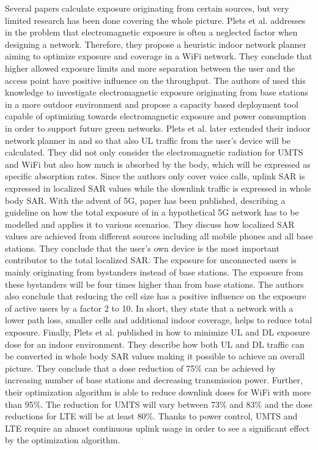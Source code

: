 Several papers calculate exposure originating from certain sources, but very  limited research has been done covering the whole picture.
Plets et al. addresses in \cite{J6_originalExposureFormula} the problem that electromagnetic exposure is often a neglected 
factor when designing a network. Therefore, they propose a heuristic indoor network planner aiming to optimize
exposure and coverage in a WiFi network. They conclude that higher allowed exposure limits and more separation between the user and 
the access point 
have positive influence on the throughput.
The authors of \cite{J1} used this knowledge 
to investigate electromagnetic exposure originating from base stations in a more outdoor environment
and propose a capacity based deployment tool capable of optimizing towards electromagnetic exposure and power consumption 
in order to support future green networks.
Plets et al. later extended their indoor network planner in \cite{J10_RDP} and \cite{J10.1} so that also  
\gls{UL} traffic from the user's device will be calculated. 
They did not only consider the electromagnetic radiation for \gls{UMTS} and WiFi
but also how much is absorbed by the body, which will be expressed as specific absorption rates. 
Since the authors only cover voice calls,
uplink SAR is expressed in localized SAR values while the downlink traffic is expressed in whole body SAR.
 With the advent of 5G, paper \cite{J17_kuehn2019modelling} has been 
published, describing a guideline on how the total exposure of in a hypothetical 5G network has to be modelled and applies it 
to various scenarios.
They discuss how localized SAR values are achieved from different sources including all mobile phones and all base stations.
They conclude that the user's own device is the most important contributor to the total localized SAR. 
The exposure for unconnected users is mainly originating from bystanders instead of base stations. The exposure 
from these bystanders will be four times higher than from base stations.
The authors also conclude that reducing the cell size has a positive influence on the exposure of active users by 
a factor 2 to 10.
In short, they state that a network with a lower path
loss, smaller cells and additional indoor coverage, helps to reduce total exposure.
Finally, Plets et al. published in \cite{J22_plets2015joint} how 
to minimize \gls{UL} and \gls{DL} exposure dose for an indoor environment. They describe how both \gls{UL} and \gls{DL} traffic 
can be converted in whole body SAR values making it possible to achieve an overall picture.
They conclude that a dose reduction of 75\% can be achieved by increasing number of base stations and decreasing transmission power.
Further, their optimization algorithm is able to reduce downlink doses for WiFi with more than
95\%. The reduction for \gls{UMTS} will vary between 73\% and 83\% and 
 the dose reductions for  \gls{LTE}  will be at least 80\%.
Thanks to power control, \gls{UMTS} and \gls{LTE} require an almost continuous uplink usage in order to 
see a significant effect by the optimization algorithm.

